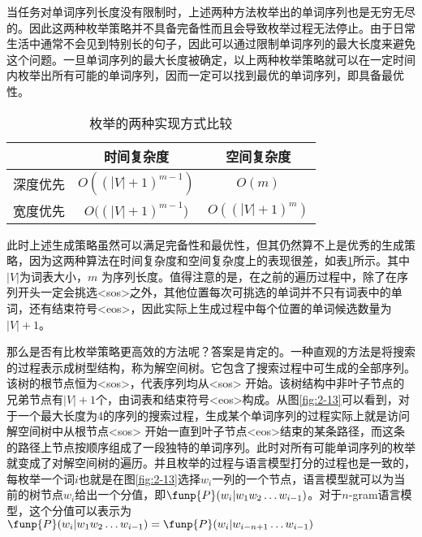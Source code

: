 \parinterval 当任务对单词序列长度没有限制时，上述两种方法枚举出的单词序列也是无穷无尽的。因此这两种枚举策略并不具备完备性而且会导致枚举过程无法停止。由于日常生活中通常不会见到特别长的句子，因此可以通过限制单词序列的最大长度来避免这个问题。一旦单词序列的最大长度被确定，以上两种枚举策略就可以在一定时间内枚举出所有可能的单词序列，因而一定可以找到最优的单词序列，即具备最优性。

\begin{table}[htp]{
\begin{center}
\caption{枚举的两种实现方式比较}
{
\begin{tabular}{c|c|c}
\rule{0pt}{10pt} & 时间复杂度 & 空间复杂度\\ \hline
\rule{0pt}{10pt} 深度优先 & $O({(|V|+1)}^{m-1})$ & $O(m)$ \\
\rule{0pt}{10pt} 宽度优先 & $O({(|V|+1)}^{m-1}$) & $O({(|V|+1)}^{m})$ \\
\end{tabular}
\label{tab:2-4}
}
\end{center}
}\end{table}

\parinterval 此时上述生成策略虽然可以满足完备性和最优性，但其仍然算不上是优秀的生成策略，因为这两种算法在时间复杂度和空间复杂度上的表现很差，如表\ref{tab:2-4}所示。其中$|V|$为词表大小，$m$ 为序列长度。值得注意的是，在之前的遍历过程中，除了在序列开头一定会挑选<sos>之外，其他位置每次可挑选的单词并不只有词表中的单词，还有结束符号<eos>，因此实际上生成过程中每个位置的单词候选数量为$|V|+1$。

\parinterval 那么是否有比枚举策略更高效的方法呢？答案是肯定的。一种直观的方法是将搜索的过程表示成树型结构，称为解空间树。它包含了搜索过程中可生成的全部序列。该树的根节点恒为<sos>，代表序列均从<sos> 开始。该树结构中非叶子节点的兄弟节点有$|V|+1$个，由词表和结束符号<eos>构成。从图\ref{fig:2-13}可以看到，对于一个最大长度为4的序列的搜索过程，生成某个单词序列的过程实际上就是访问解空间树中从根节点<sos> 开始一直到叶子节点<eos>结束的某条路径，而这条的路径上节点按顺序组成了一段独特的单词序列。此时对所有可能单词序列的枚举就变成了对解空间树的遍历。并且枚举的过程与语言模型打分的过程也是一致的，每枚举一个词$i$也就是在图\ref{fig:2-13}选择$w_i$一列的一个节点，语言模型就可以为当前的树节点$w_i$给出一个分值，即$\funp{P}(w_i | w_1 w_2 \ldots w_{i-1})$。对于$n$-gram语言模型，这个分值可以表示为$\funp{P}(w_i | w_1 w_2 \ldots w_{i-1})=\funp{P}(w_i | w_{i-n+1} \ldots w_{i-1})$

